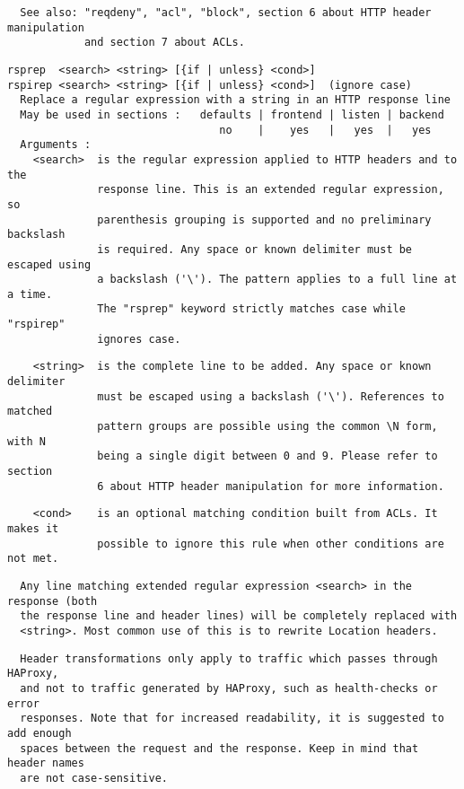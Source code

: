 \begin{verbatim}
  See also: "reqdeny", "acl", "block", section 6 about HTTP header manipulation
            and section 7 about ACLs.
\end{verbatim}

\begin{verbatim}
rsprep  <search> <string> [{if | unless} <cond>]
rspirep <search> <string> [{if | unless} <cond>]  (ignore case)
  Replace a regular expression with a string in an HTTP response line
  May be used in sections :   defaults | frontend | listen | backend
                                 no    |    yes   |   yes  |   yes
  Arguments :
    <search>  is the regular expression applied to HTTP headers and to the
              response line. This is an extended regular expression, so
              parenthesis grouping is supported and no preliminary backslash
              is required. Any space or known delimiter must be escaped using
              a backslash ('\'). The pattern applies to a full line at a time.
              The "rsprep" keyword strictly matches case while "rspirep"
              ignores case.
\end{verbatim}

\begin{verbatim}
    <string>  is the complete line to be added. Any space or known delimiter
              must be escaped using a backslash ('\'). References to matched
              pattern groups are possible using the common \N form, with N
              being a single digit between 0 and 9. Please refer to section
              6 about HTTP header manipulation for more information.
\end{verbatim}

\begin{verbatim}
    <cond>    is an optional matching condition built from ACLs. It makes it
              possible to ignore this rule when other conditions are not met.
\end{verbatim}

\begin{verbatim}
  Any line matching extended regular expression <search> in the response (both
  the response line and header lines) will be completely replaced with
  <string>. Most common use of this is to rewrite Location headers.
\end{verbatim}

\begin{verbatim}
  Header transformations only apply to traffic which passes through HAProxy,
  and not to traffic generated by HAProxy, such as health-checks or error
  responses. Note that for increased readability, it is suggested to add enough
  spaces between the request and the response. Keep in mind that header names
  are not case-sensitive.
\end{verbatim}

